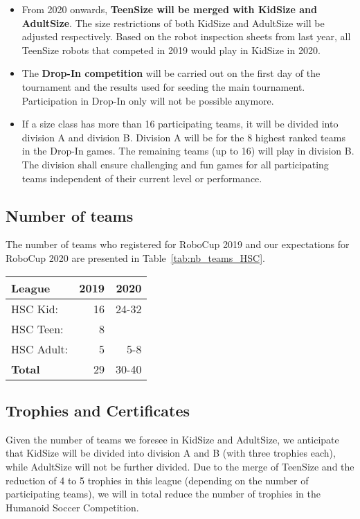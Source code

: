 \documentclass{article}
\begin{document}
\begin{itemize}
\item From 2020 onwards, \textbf{TeenSize will be merged with KidSize and AdultSize}. The size restrictions of both KidSize and AdultSize will be adjusted respectively. Based on the robot inspection sheets from last year, all TeenSize robots that competed in 2019 would play in KidSize in 2020.
\item The \textbf{Drop-In competition} will be carried out on the first day of the tournament and the results used for seeding the main tournament. Participation in Drop-In only will not be possible anymore.
\item If a size class has more than 16 participating teams, it will be divided into division A and division B. Division A will be for the 8 highest ranked teams in the Drop-In games. The remaining teams (up to 16) will play in division B. The division shall ensure challenging and fun games for all participating teams independent of their current level or performance.
\end{itemize}

\subsection{Number of teams}
The number of teams who registered for RoboCup 2019 and our expectations for
RoboCup 2020 are presented in Table~\ref{tab:nb_teams_HSC}.

\begin{table}[h]
  \centering
  \begin{tabular}{l | r | r}
    League & 2019 & 2020\\
    \hline
    HSC Kid: & 16 & 24-32\\ 
    HSC Teen: & 8 & \\ 
    HSC Adult: & 5 & 5-8\\ 
    \textbf{Total} & 29 & 30-40
  \end{tabular}
\end{table}

\subsection{Trophies and Certificates}
Given the number of teams we foresee in KidSize and AdultSize, we anticipate that KidSize will be divided into division A and B (with three trophies each), while AdultSize will not be further divided. Due to the merge of TeenSize and the reduction of 4 to 5 trophies in this league (depending on the number of participating teams), we will in total reduce the number of trophies in the Humanoid Soccer Competition.
\end{document}
